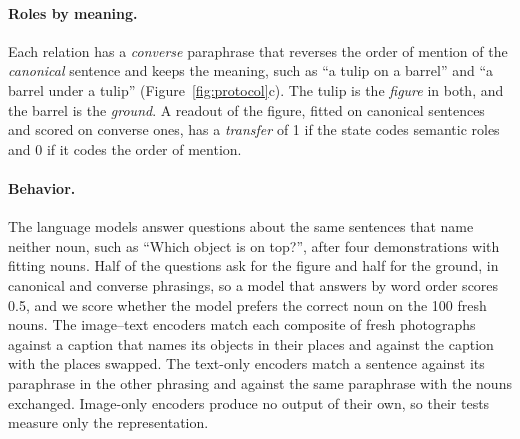 \paragraph{Roles by meaning.} Each relation has a \emph{converse} paraphrase that reverses the order of mention of the \emph{canonical} sentence and keeps the meaning, such as ``a tulip on a barrel'' and ``a barrel under a tulip'' (Figure~\ref{fig:protocol}c). The tulip is the \emph{figure} in both, and the barrel is the \emph{ground}. A readout of the figure, fitted on canonical sentences and scored on converse ones, has a \emph{transfer} of 1 if the state codes semantic roles and 0 if it codes the order of mention.

\paragraph{Behavior.} The language models answer questions about the same sentences that name neither noun, such as ``Which object is on top?'', after four demonstrations with fitting nouns. Half of the questions ask for the figure and half for the ground, in canonical and converse phrasings, so a model that answers by word order scores 0.5, and we score whether the model prefers the correct noun on the 100 fresh nouns. The image--text encoders match each composite of fresh photographs against a caption that names its objects in their places and against the caption with the places swapped. The text-only encoders match a sentence against its paraphrase in the other phrasing and against the same paraphrase with the nouns exchanged. Image-only encoders produce no output of their own, so their tests measure only the representation.

